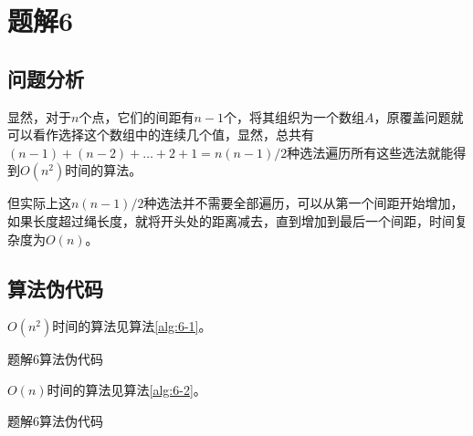 \section{题解6}
\subsection{问题分析}
显然，对于$n$个点，它们的间距有$n-1$个，将其组织为一个数组$A$，原覆盖问题就可以看作选择这个数组中的连续几个值，显然，总共有$(n-1)+(n-2)+\dots+2+1=n(n-1)/2$种选法遍历所有这些选法就能得到$O(n^2)$时间的算法。

但实际上这$n(n-1)/2$种选法并不需要全部遍历，可以从第一个间距开始增加，如果长度超过绳长度，就将开头处的距离减去，直到增加到最后一个间距，时间复杂度为$O(n)$。

\subsection{算法伪代码}
$O(n^2)$时间的算法见算法\ref{alg:6-1}。
\begin{algorithm}[htbp]
\caption{题解6算法伪代码}\label{alg:6-1}
\end{algorithm}
$O(n)$时间的算法见算法\ref{alg:6-2}。
\begin{algorithm}[htbp]
\caption{题解6算法伪代码}\label{alg:6-2}
\end{algorithm}